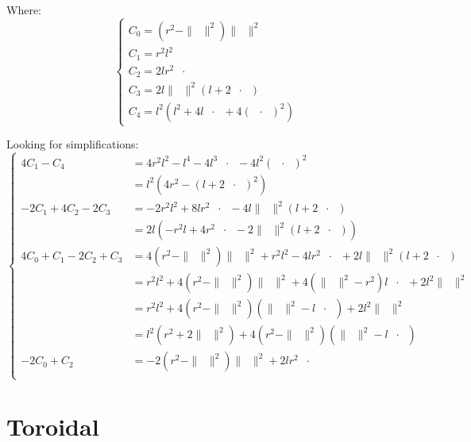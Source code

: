\documentclass[10pt,a4paper]{article}
\newcommand{\ud}[1]{\underline{#1}}
\DeclareMathOperator{\OA}{\ud{OA}}
\DeclareMathOperator{\e}{\ud{e}}
\begin{document}
Where:
$$
\left\{
\begin{array}{llll}
    C_0 = (r^2 - \|\OA\|^2)\|\OA\|^2\\
    C_1 = r^2l^2\\
    C_2 = 2lr^2\OA\cdot\e\\
    C_3 = 2l\|\OA\|^2(l + 2\OA\cdot\e)\\
    C_4 = l^2(l^2 + 4l\OA\cdot\e + 4(\OA\cdot\e)^2 )
\end{array}
\right.
$$


Looking for simplifications:    
$$
\left\{
\begin{array}{llll}
    4C_1 - C_4
    & = 4r^2l^2 - l^4 - 4l^3\OA\cdot\e - 4l^2(\OA\cdot\e)^2\\
    & = l^2\left(4r^2 - (l + 2\OA\cdot\e)^2\right)\\

    -2C_1 + 4C_2 - 2C_3
    & = -2r^2l^2 + 8lr^2\OA\cdot\e - 4l\|\OA\|^2(l + 2\OA\cdot\e)\\
    & =  2l\left( -r^2l + 4r^2\OA\cdot\e - 2\|\OA\|^2(l + 2\OA\cdot\e)  \right)\\
    
    4C_0 + C_1 - 2C_2  + C_3
    & = 4(r^2 - \|\OA\|^2)\|\OA\|^2 + r^2l^2
     - 4lr^2\OA\cdot\e + 2l\|\OA\|^2(l + 2\OA\cdot\e)\\
    & = r^2l^2 + 4(r^2 - \|\OA\|^2)\|\OA\|^2
    + 4(\|\OA\|^2 - r^2)l\OA\cdot\e + 2l^2\|\OA\|^2\\
    & = r^2l^2 + 4(r^2 - \|\OA\|^2)(\|\OA\|^2 - l\OA\cdot\e) + 2l^2\|\OA\|^2\\
    & = l^2(r^2+ 2\|\OA\|^2) + 4(r^2 - \|\OA\|^2)(\|\OA\|^2 - l\OA\cdot\e)\\

    -2C_0 + C_2
    & = -2(r^2 - \|\OA\|^2)\|\OA\|^2 + 2lr^2\OA\cdot\e\\
\end{array}
\right.
$$


\newpage
\section{Toroidal}
\end{document}
